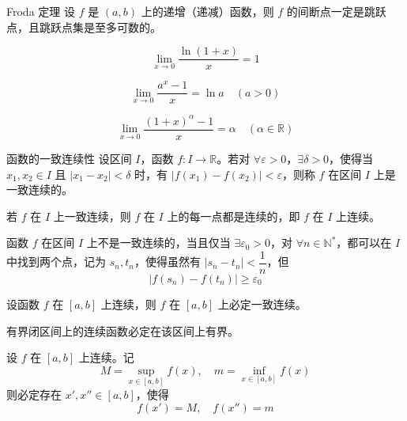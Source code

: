 \begin{theorem}{Froda 定理}
  设 $f$ 是 $(a, b)$ 上的递增（递减）函数，则 $f$ 的间断点一定是跳跃点，且跳跃点集是至多可数的。
\end{theorem}

\hfill

\begin{example}
  \[\lim_{x \to 0}\frac{\ln (1 + x)}{x} = 1\]
\end{example}

\hfill

\begin{example}
  \[\lim_{x \to 0}\frac{a^x - 1}{x} = \ln a\quad (a > 0)\]
\end{example}

\hfill

\begin{example}
  \[\lim_{x \to 0}\frac{(1 + x)^{\alpha} - 1}{x} = \alpha\quad (\alpha \in \mathbb{R})\]
\end{example}

\hfill

\begin{definition}{函数的一致连续性}
  设区间 $I$，函数 $f: I \to \mathbb{R}$。若对 $\forall \varepsilon > 0$，$\exists \delta > 0$，使得当 $x_1, x_2 \in I$ 且 $|x_1 - x_2| < \delta$ 时，有 $|f(x_1) - f(x_2)| < \varepsilon$，则称 $f$ 在区间 $I$ 上是一致连续的。
\end{definition}

\begin{remark}
  若 $f$ 在 $I$ 上一致连续，则 $f$ 在 $I$ 上的每一点都是连续的，即 $f$ 在 $I$ 上连续。
\end{remark}

\begin{definition}
  函数 $f$ 在区间 $I$ 上不是一致连续的，当且仅当 $\exists \varepsilon_0 > 0$，对 $\forall n \in \mathbb{N}^{*}$，都可以在 $I$ 中找到两个点，记为 $s_n, t_n$，使得虽然有 $|s_n - t_n| < \dfrac{1}{n}$，但
  \[|f(s_n) - f(t_n)| \geqslant \varepsilon_0\]
\end{definition}

\begin{theorem}
  设函数 $f$ 在 $[a, b]$ 上连续，则 $f$ 在 $[a, b]$ 上必定一致连续。
\end{theorem}

\begin{theorem}
  有界闭区间上的连续函数必定在该区间上有界。
\end{theorem}

\begin{theorem}
  设 $f$ 在 $[a, b]$ 上连续。记
  \[M = \sup_{x \in [a, b]} f(x),\quad m = \inf_{x \in [a, b]} f(x)\]
  则必定存在 $x', x'' \in [a, b]$，使得
  \[f(x') = M,\quad f(x'') = m\]
\end{theorem}

